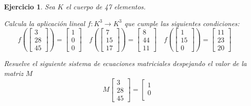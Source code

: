 \documentclass[12pt]{amsart}
\newtheorem{ejer}{Ejercicio}
\begin{document}
\begin{ejer} Sea $K$ el cuerpo de 47 elementos.
\newline
\noindent\begin{minipage}{\textwidth}
\begin{tcolorbox}[colback = green!20!white,title=Versión Aplicación]
Calcula la aplicaci\'on lineal $f:K^{3} \to K^{3}$ que cumple las siguientes condiciones: 
\[f\left(\left[\begin{array}{r}
3 \\
28 \\
45
\end{array}\right]\right) = \left[\begin{array}{r}
1 \\
0 \\
0
\end{array}\right] \quad f\left(\left[\begin{array}{r}
7 \\
15 \\
17
\end{array}\right]\right) = \left[\begin{array}{r}
8 \\
44 \\
11
\end{array}\right] \quad f\left(\left[\begin{array}{r}
1 \\
15 \\
0
\end{array}\right]\right) = \left[\begin{array}{r}
11 \\
23 \\
20
\end{array}\right] \quad 
\]\end{tcolorbox}
\end{minipage} \newline
\noindent\begin{minipage}{\textwidth}
\begin{tcolorbox}[colback = blue!20!white,title=Versión Sistema Matricial]
Resuelve el siguiente sistema de ecuaciones matriciales despejando el valor de la matriz $M$
\[M \left[\begin{array}{r}
3 \\
28 \\
45
\end{array}\right] = \left[\begin{array}{r}
1 \\
0 \\

\end{array}\]
\end{tcolorbox}
\end{minipage}
\end{ejer}
\end{document}
